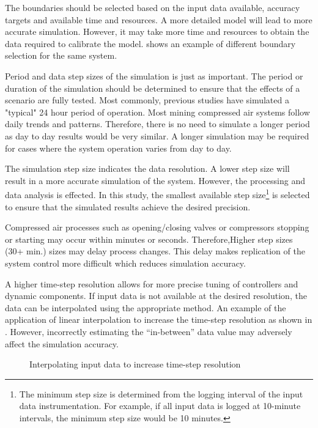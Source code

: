 	\par 
	The boundaries should be selected based on the input data available, accuracy targets and available time and resources. A more detailed model will lead to more accurate simulation. However, it may take more time and resources to obtain the data required to calibrate the model.  shows an example of different boundary selection for the same system.
	\par
	Period and data step sizes of the simulation is just as important. The period or duration of the simulation should be determined to ensure that the effects of a scenario are fully tested. Most commonly, previous studies have simulated a "typical" 24 hour period of operation. Most mining compressed air systems follow daily trends and patterns. Therefore, there is no need to simulate a longer period as day to day results would be very similar. A longer simulation may be required for cases where the system operation varies from day to day.
	\par 
	The simulation step size indicates the data resolution. A lower step size will result in a more accurate simulation of the system. However, the processing and data analysis is effected. In this study, the smallest available step size\footnote{The minimum step size is determined from the logging interval of the input data instrumentation. For example, if all input data is logged at 10-minute intervals, the minimum step size would be 10 minutes.} is selected to ensure that the simulated results achieve the desired precision. 
	\par 
	 Compressed air processes such as opening/closing valves or compressors stopping or starting may occur within minutes or seconds. Therefore,Higher step sizes (30+ min.) sizes may delay process changes. This delay makes replication of the system control more difficult which reduces simulation accuracy.
	\par
	A higher time-step resolution allows for more precise tuning of controllers and dynamic components. If input data is not available at the desired resolution, the data can be interpolated using the appropriate method. An example of the application of linear interpolation to increase the time-step resolution as shown in . However, incorrectly estimating the \enquote{in-between}  data value may adversely affect the simulation accuracy.
	
	\begin{figure}[h]
		\centering
		\fbox{}
		\caption{Interpolating input data to increase time-step resolution}
		\label{fig: Inter}
	\end{figure}
